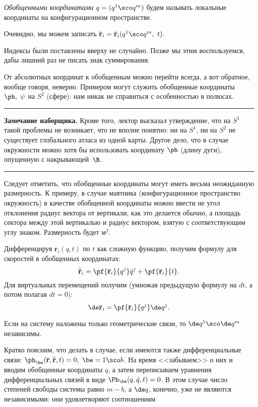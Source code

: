 \documentclass[a4paper,12pt]{article}
\newcommand{\vb}[1]{\mathbf{\overline{#1}}}
\newcommand{\vd}[1]{\dot{\mathbf{\overline{#1}}}}
\newcommand{\tdf}[1]{\textsl{#1}}
\newenvironment{nbb}{\par\vskip3pt\hrule\vskip3pt\textbf{\footnotesize Замечание наборщика.}\footnotesize }
{\vskip3pt\hrule\par\vskip3pt}
\newcommand{\eql}[2]{\begin{equation}\label{#2}#1\end{equation}}
\begin{document}
\begin{df}
\tdf{Обобщенными координатами} $q=(q^1\sco q^m)$ будем называть
локальные координаты на конфигурационном пространстве.
\end{df}

Очевидно, мы можем записать $\vb{r}_i=\vb{r}_i(q^1\sco q^m,\ t)$.
\begin{note}
Индексы были поставлены вверху не случайно. Позже мы этим
воспользуемся, дабы лишний раз не писать знак суммирования.
\end{note}
\begin{note}
От абсолютных координат к обобщенным можно перейти всегда, а вот
обратное, вообще говоря, неверно. Примером могут служить обобщенные
координаты $\ph,\ \psi$ на $S^2$ (сфере): нам никак не справиться с
особенностью в полюсах.
\end{note}

\begin{nbb}
Кроме того, лектор высказал утверждение, что на $S^1$ такой
проблемы не возникает, что не вполне понятно: ни на $S^1$, ни на $S^2$
не существует глобального атласа из одной карты. Другое дело, что в случае окружности
можно хотя бы использовать координату $\ph$ (длину дуги), опущенную с накрывающей~$\R$.
\end{nbb}

\begin{note}
Следует отметить, что обобщенные координаты могут иметь весьма
неожиданную размерность. К примеру, в случае маятника
(конфигурационное пространство окружность) в качестве обобщенной
координаты можно ввести не угол отклонения радиус вектора от
вертикали, как это делается обычно, а площадь сектора между этой
вертикалью и радиус вектором, взятую с соответствующим углу знаком.
Размерность будет $\text{м}^2$.
\end{note}

Дифференцируя $\vb{r}_i(q,t)$ по $t$ как сложную функцию, получим
формулу для скоростей в обобщенных координатах:
\eql{\vd{r}_i=\pf{\vb{r}_i}{q^j}\dot{q}^j+\pf{\vb{r}_i}{t}.}{speed_gen}
Для виртуальных перемещений получим (умножая предыдущую формулу на
$dt$, а потом полагая $dt=0$):
\eql{\de\vb{r}_i=\pf{\vb{r}_i}{q^j}\de q^j.}{virt_gen}

\begin{note}
Если на систему наложены только геометрические связи, то $\de
q^1\sco\de q^m$ независимы.
\end{note}

\begin{note}
Кратко поясним, что делать в случае, если имеются также
дифференциальные связи: $\ph_{\be}(\vb{r},\vd{r},t)=0,\ \be=1\sco
b$. На время <<забываем>> о них и вводим обобщенные координаты $q$,
а затем переписываем уравнения дифференциальных связей в виде
$\Ph_{\be}(q,\dot{q},t)=0$. В этом случае число степеней свободы
системы равно $m-b$, а $\de q$, конечно, уже не являются
независимыми: они удовлетворяют соотношениям
\end{note}
\end{document}

